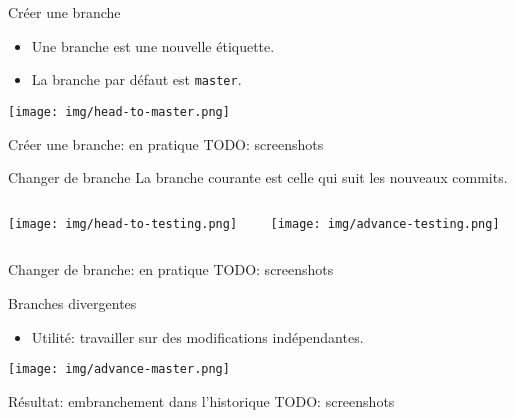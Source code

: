 \documentclass{beamer}
\begin{document}
\begin{frame}{Créer une branche}
    \begin{itemize}
        \item Une branche est une nouvelle étiquette.
        \item La branche par défaut est \texttt{master}.
    \end{itemize}
    \begin{center}
        \texttt{[image: img/head-to-master.png]}
    \end{center}
\end{frame}

\begin{frame}{Créer une branche: en pratique}
    TODO: screenshots
\end{frame}

\begin{frame}{Changer de branche}
    La branche courante est celle qui suit les nouveaux commits.
    \begin{columns}
        \begin{column}{0.44\textwidth}
            \begin{center}
                \texttt{[image: img/head-to-testing.png]}
            \end{center}
        \end{column}
        \begin{column}{0.54\textwidth}
            \texttt{[image: img/advance-testing.png]}
        \end{column}
    \end{columns}
\end{frame}

\begin{frame}{Changer de branche: en pratique}
    TODO: screenshots
\end{frame}

\begin{frame}{Branches divergentes}
    \begin{itemize}
        \item Utilité: travailler sur des modifications indépendantes.
    \end{itemize}
    \begin{center}
        \texttt{[image: img/advance-master.png]}
    \end{center}
\end{frame}

\begin{frame}{Résultat: embranchement dans l'historique}
    TODO: screenshots
\end{frame}
\end{document}
